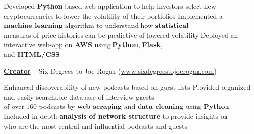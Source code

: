 \documentclass[letterpaper,MMMyyyy,nonstopmode]{simpleresumecv}
\begin{document}
\begin{Body}
\begin{Detail}


\Gap

\BulletItem
Developed \textbf{Python}-based web application to help investors select new \\cryptocurrencies to lower the volatility of their portfolios
\BulletItem
Implemented a \textbf{machine learning} algorithm to understand how \textbf{statistical} \\measures of price histories can be predictive of lowered volatility
\BulletItem
Deployed an interactive web-app on \textbf{AWS} using \textbf{Python}, \textbf{Flask}, \\ and \textbf{HTML/CSS}

\vspace{1.5mm}





\Entry

\href{http://www.sixdegreestojoerogan.com/}
{\textbf{Creator}} -- Six Degrees to Joe Rogan (\href{http://www.sixdegreestojoerogan.com/}{www.sixdegreestojoerogan.com}) \hfill {} -- 








\Gap

\BulletItem
Enhanced discoverability of new podcasts based on guest lists
\BulletItem
Provided organized and easily searchable database of interview guests \\of over 160 podcasts by \textbf{web scraping} and \textbf{data cleaning} using \textbf{Python}
\BulletItem
Included in-depth \textbf{analysis of network structure} to provide insights on \\who are the most central and influential podcasts and guests
\vspace{1.5mm}


\end{Detail}
\end{Body}
\end{document}
